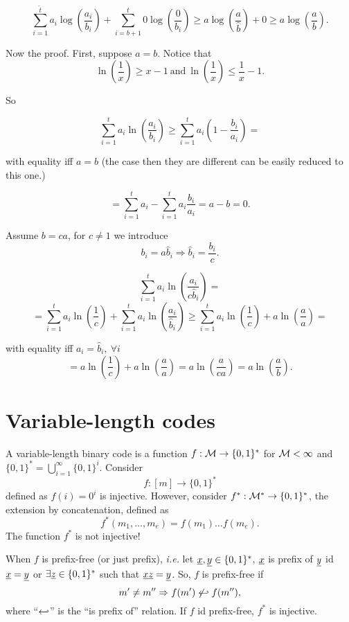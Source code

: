 \[
\sum_{i= 1}^{\hat{t}}a_i\log\left(\dfrac{a_i}{b_i}\right)+ \sum_{i=b + 1}^t 0\log\left(\dfrac{0}{b_i}\right) \geq a\log\left(\dfrac{a}{\hat{b}}\right) + 0 \geq a\log\left(\dfrac{a}{b}\right).
\]

Now the proof. First, suppose $a=b$. Notice that $$\ln\left(\dfrac{1}{x}\right)\geq x - 1\ \text{and}\ \ln\left(\dfrac{1}{x}\right)\leq \dfrac{1}{x} - 1.$$

So

\[
\sum_{i=1}^ta_i\ln\left(\dfrac{a_i}{b_i}\right) \geq \sum_{i=1}^ta_i\left(1-\dfrac{b_i}{a_i}\right) =  
\]

with equality iff $a=b$ (the case then they are different can be easily reduced to this one.)

\[
= \sum_{i = 1}^ta_i - \sum_{i=1}^ta_i\dfrac{b_i}{a_i} = a -b = 0.
\]

Assume $b = ca$, for $c \not=1$ we introduce $$b_i = a\hat{b}_i \Rightarrow \hat{b}_i = \dfrac{b_i}{c}.$$

\[
\sum_{i = 1}^t a_i\ln\left(\dfrac{a_i}{c\hat{b}_i} \right) = \]
\[ = \sum_{i=1}^{t}a_i\ln\left(\dfrac{1}{c} \right) + \sum_{i=1}^ta_i\ln\left(\dfrac{a_i}{\hat{b}_i} \right) \geq  \sum_{i=1}^{t}a_i\ln\left(\dfrac{1}{c} \right) + a\ln\left(\dfrac{a}{a} \right) = \]

with equality iff $a_i = \hat{b}_i,\ \forall i$
\[
 = a\ln\left(\dfrac{1}{c}\right) + a\ln\left(\dfrac{a}{a}\right) = a\ln\left(\dfrac{a}{ca} \right) = a\ln\left(\dfrac{a}{b} \right).
 \]
 
\section{Variable-length codes}

A variable-length binary code is a function $f:\mathcal{M} \rightarrow \{0, 1\}^*$ for $\mathcal{M} < \infty$ and $\{0, 1\}^* = \bigcup_{i = 1}^\infty \{0, 1\}^i$. Consider $$f:[m] \rightarrow \{0, 1\}^*$$ defined as $f(i) = 0^i$ is injective. However, consider $f^*:\mathcal{M}^* \rightarrow \{0, 1\}^*$, the extension by concatenation, defined as $$f^*(m_1, \ldots, m_e) = f(m_1)\ldots f(m_e).$$ The function $f^*$ is not injective!

When $f$ is prefix-free (or just prefix), \emph{i.e.} let $\underline{x}, \underline{y} \in \{0, 1\}^*$, $\underline{x}$ is prefix of $\underline{y}$ id $\underline{x} = \underline{y}$ or $\exists \underline{z} \in \{0, 1\}^*$ such that $\underline{x}\underline{z} = \underline{y}$. So, $f$ is prefix-free if $$m'\not=m'' \Rightarrow f(m') \not\hookleftarrow f(m''),$$ where ``$\hookleftarrow$'' is the ``is prefix of'' relation. If $f$ id prefix-free, $f^*$ is injective. 

